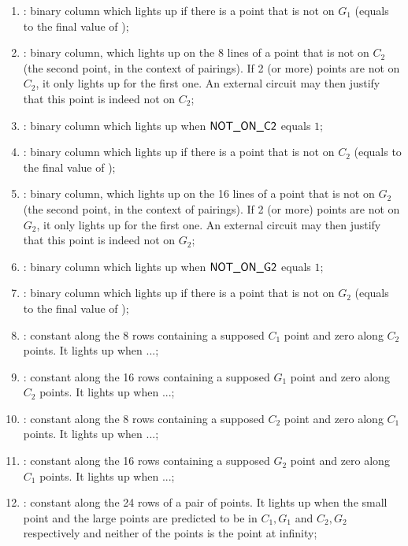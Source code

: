 \begin{enumerate}[resume]
      \item \notOnGOneAccMax: binary column which lights up if there is a point that is not on $G_1$ (equals to the final value of \notOnGOneAcc);
      \item \notOnCTwo{} \blsPrediction{}: binary column, which lights up on the 8 lines of a point that is not on $C_2$ (the second point, in the context of pairings). If 2 (or more) points are not on $C_2$, it only lights up for the first one. An external circuit may then justify that this point is indeed not on $C_2$;       
      \item \notOnCTwoAcc: binary column which lights up when $\textsf{NOT\_ON\_C2}$ equals $1$;    
      \item \notOnCTwoAccMax: binary column which lights up if there is a point that is not on $C_2$ (equals to the final value of \notOnCTwoAcc);
      \item \notOnGTwo{} \blsPrediction{}: binary column, which lights up on the 16 lines of a point that is not on $G_2$ (the second point, in the context of pairings). If 2 (or more) points are not on $G_2$, it only lights up for the first one. An external circuit may then justify that this point is indeed not on $G_2$;
      \item \notOnGTwoAcc: binary column which lights up when $\textsf{NOT\_ON\_G2}$ equals $1$;
      \item \notOnGTwoAccMax: binary column which lights up if there is a point that is not on $G_2$ (equals to the final value of \notOnGTwoAcc);
      \item \both{\cOneMembershipTestRequired}:
            constant along the 8 rows containing a supposed $C_1$ point and zero along $C_2$ points. It lights up when ...;
      \item \both{\gOneMembershipTestRequired}:
            constant along the 16 rows containing a supposed $G_1$ point and zero along $C_2$ points. It lights up when ...;
      \item \both{\cTwoMembershipTestRequired}:
            constant along the 8 rows containing a supposed $C_2$ point and zero along $C_1$ points. It lights up when ...;
      \item \both{\gTwoMembershipTestRequired}:
            constant along the 16 rows containing a supposed $G_2$ point and zero along $C_1$ points. It lights up when ...;
      \item \both{\acceptablePairOfPoints}: constant along the 24 rows of a pair of points. It lights up when the small point and the large points are predicted to be in $C_1,G_1$ and $C_2, G_2$ respectively and neither of the points is the point at infinity;
\end{enumerate}
     
